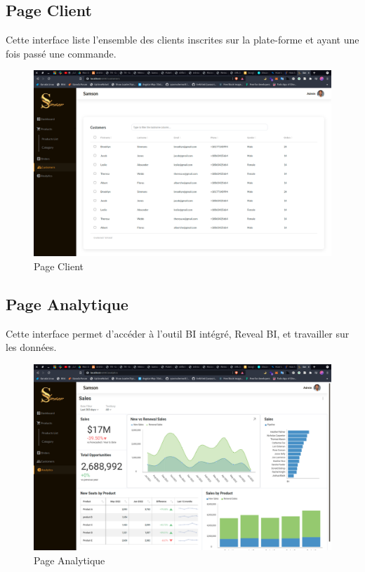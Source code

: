 \documentclass[a4paper, 12pt]{report}
\begin{document}
\subsection{Page Client}
Cette interface liste l'ensemble des clients inscrites sur la plate-forme et ayant une fois passé une commande. 
\begin{figure}[H]
    \centering
    \includegraphics[width = 1\linewidth]{img/client.png}
    \caption{Page Client}
\end{figure}

\subsection{Page Analytique}
Cette interface permet d'accéder à l'outil BI intégré, Reveal BI, et travailler sur les données.
\begin{figure}[H]
    \centering
    \includegraphics[width = 1\linewidth]{img/analytic.png}
    \caption{Page Analytique}
\end{figure}
\end{document}
